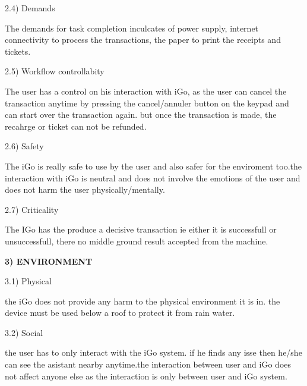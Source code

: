 \documentclass[12pt]{article}
\begin{document}
2.4) Demands\par

The demands for task completion inculcates of power supply, internet connectivity to process the transactions, the paper to print the receipts and tickets.\par


\vspace{\baselineskip}

\vspace{\baselineskip}
2.5) Workflow controllabity\par

The user has a control on his interaction with iGo, as the user can cancel the transaction anytime by pressing the cancel/annuler button on the keypad and  can start over the transaction again. but once the transaction is made, the recahrge or ticket can not be refunded.\par

2.6) Safety\par

The iGo is really safe to use by the user and also safer for the enviroment too.the interaction with iGo is neutral and does not involve the emotions of the user and does not harm the user physically/mentally.\par


\vspace{\baselineskip}
2.7) Criticality\par

The IGo has the produce a decisive transaction ie either it is successfull or unsuccessfull, there no middle ground result accepted from the machine.\par


\vspace{\baselineskip}

\vspace{\baselineskip}
\textbf{3) ENVIRONMENT}\par

3.1) Physical\par

the iGo does not provide any harm to the physical environment it is in. the device must be used below a roof to protect it from rain water.\par


\vspace{\baselineskip}
3.2) Social\par

the user has to only interact with the iGo system. if he finds any isse then he/she can see the asistant nearby anytime.the interaction between user and iGo does not affect anyone else as the interaction is only between user and iGo system.\par
\end{document}
